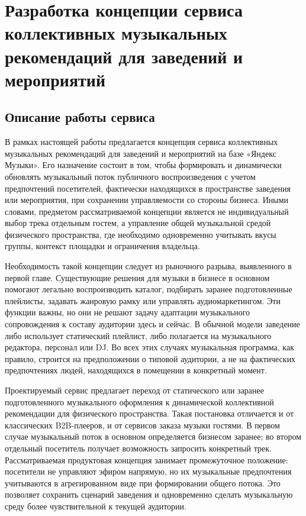 \chapter{Разработка концепции сервиса коллективных музыкальных рекомендаций для заведений и мероприятий}
\label{ch:service-concept}

\section{Описание работы сервиса}
\label{sec:service:concept}

В рамках настоящей работы предлагается концепция сервиса коллективных музыкальных рекомендаций для заведений и мероприятий на базе «Яндекс Музыки». Его назначение состоит в том, чтобы формировать и динамически обновлять музыкальный поток публичного воспроизведения с учетом предпочтений посетителей, фактически находящихся в пространстве заведения или мероприятия, при сохранении управляемости со стороны бизнеса. Иными словами, предметом рассматриваемой концепции является не индивидуальный выбор трека отдельным гостем, а управление общей музыкальной средой физического пространства, где необходимо одновременно учитывать вкусы группы, контекст площадки и ограничения владельца.

Необходимость такой концепции следует из рыночного разрыва, выявленного в первой главе. Существующие решения для музыки в бизнесе в основном помогают легально воспроизводить каталог, подбирать заранее подготовленные плейлисты, задавать жанровую рамку или управлять аудиомаркетингом. Эти функции важны, но они не решают задачу адаптации музыкального сопровождения к составу аудитории здесь и сейчас. В обычной модели заведение либо использует статический плейлист, либо полагается на музыкального редактора, персонал или DJ. Во всех этих случаях музыкальная программа, как правило, строится на предположении о типовой аудитории, а не на фактических предпочтениях людей, находящихся в помещении в конкретный момент.

Проектируемый сервис предлагает переход от статического или заранее подготовленного музыкального оформления к динамической коллективной рекомендации для физического пространства. Такая постановка отличается и от классических B2B-плееров, и от сервисов заказа музыки гостями. В первом случае музыкальный поток в основном определяется бизнесом заранее; во втором отдельный посетитель получает возможность запросить конкретный трек. Рассматриваемая продуктовая концепция занимает промежуточное положение: посетители не управляют эфиром напрямую, но их музыкальные предпочтения учитываются в агрегированном виде при формировании общего потока. Это позволяет сохранить сценарий заведения и одновременно сделать музыкальную среду более чувствительной к текущей аудитории.

